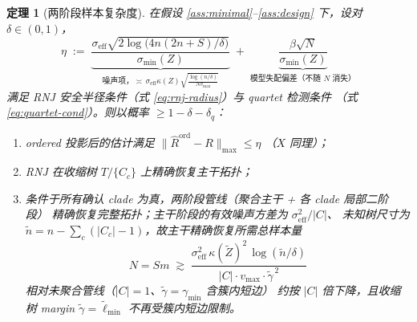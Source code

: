 \documentclass[UTF8,11pt]{ctexart}
\newtheorem{theorem}{定理}
\begin{document}
\begin{theorem}[两阶段样本复杂度]
\label{thm:two-stage}
在假设 \ref{ass:minimal}--\ref{ass:design} 下，设对 $\delta\in(0,1)$，
\begin{equation}
  \eta
  \;:=\;
  \underbrace{\frac{\sigma_{\mathrm{eff}}\sqrt{2\log\bigl(4n(2n+S)/\delta\bigr)}}
  {\sigma_{\min}(Z)}}_{\text{噪声项，}\asymp\,
  \sigma_{\mathrm{eff}}\kappa(Z)\sqrt{\frac{\log(n/\delta)}{N v_{\max}}}}
  \;+\;
  \underbrace{\frac{\beta\sqrt{N}}{\sigma_{\min}(Z)}}_{\text{模型失配偏差（不随 $N$ 消失）}}
  \label{eq:eta-def}
\end{equation}
满足 RNJ 安全半径条件（式 \eqref{eq:rnj-radius}）与 quartet 检测条件
（式 \eqref{eq:quartet-cond}）。则以概率 $\ge 1-\delta-\delta_q$：
\begin{enumerate}[label=\textup{(\alph*)},leftmargin=2.4em]
  \item ordered 投影后的估计满足 $\|\widehat R^{\mathrm{ord}}-R\|_{\max}\le\eta$
        （$X$ 同理）；
  \item RNJ 在收缩树 $T/\{C_c\}$ 上精确恢复主干拓扑；
  \item 条件于所有确认 clade 为真，两阶段管线（聚合主干 + 各 clade 局部二阶段）
        精确恢复完整拓扑；主干阶段的有效噪声方差为 $\sigma_{\mathrm{eff}}^2/|C|$、
        未知树尺寸为 $\tilde n=n-\sum_c(|C_c|-1)$，故主干精确恢复所需总样本量
        \begin{equation}
          N=Sm\;\gtrsim\;
          \frac{\sigma_{\mathrm{eff}}^2\,\kappa(\widetilde Z)^2\,
          \log(\tilde n/\delta)}{|C|\cdot v_{\max}\cdot\widetilde\gamma^{\,2}}
          \label{eq:sample-complexity}
        \end{equation}
        相对未聚合管线（$|C|=1$、$\widetilde\gamma=\gamma_{\min}$ 含簇内短边）
        约按 $|C|$ 倍下降，且收缩树 margin $\widetilde\gamma=\widetilde\ell_{\min}$
        不再受簇内短边限制。
\end{enumerate}
\end{theorem}
\end{document}
